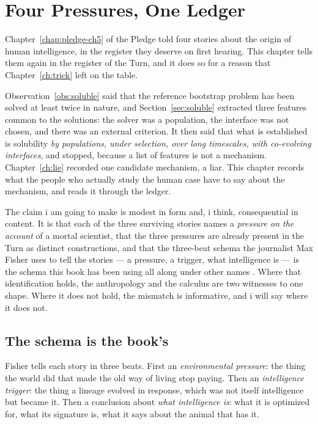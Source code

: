 \chapter{Four Pressures, One Ledger}
\label{ch:stories}

Chapter~\ref{chap:pledge-ch5} of the Pledge told four stories about the origin of human intelligence, in the register they deserve on first hearing. This chapter tells them again in the register of the Turn, and it does so for a reason that Chapter~\ref{ch:trick} left on the table.

Observation~\ref{obs:soluble} said that the reference bootstrap problem has been solved at least twice in nature, and Section~\ref{sec:soluble} extracted three features common to the solutions: the solver was a population, the interface was not chosen, and there was an external criterion. It then said that what is established is solubility \emph{by populations, under selection, over long timescales, with co-evolving interfaces}, and stopped, because a list of features is not a mechanism. Chapter~\ref{ch:lie} recorded one candidate mechanism, a liar. This chapter records what the people who actually study the human case have to say about the mechanism, and reads it through the ledger.

The claim i am going to make is modest in form and, i think, consequential in content. It is that each of the three surviving stories names a \emph{pressure on the account} of a mortal scientist, that the three pressures are already present in the Turn as distinct constructions, and that the three-beat schema the journalist Max Fisher uses to tell the stories --- a pressure, a trigger, what intelligence is --- is the schema this book has been using all along under other names \cite{fisher2026}. Where that identification holds, the anthropology and the calculus are two witnesses to one shape. Where it does not hold, the mismatch is informative, and i will say where it does not.

\section{The schema is the book's}
\label{st:sec:schema}

Fisher tells each story in three beats. First an \emph{environmental pressure}: the thing the world did that made the old way of living stop paying. Then an \emph{intelligence trigger}: the thing a lineage evolved in response, which was not itself intelligence but became it. Then a conclusion about \emph{what intelligence is}: what it is optimized for, what its signature is, what it says about the animal that has it.

